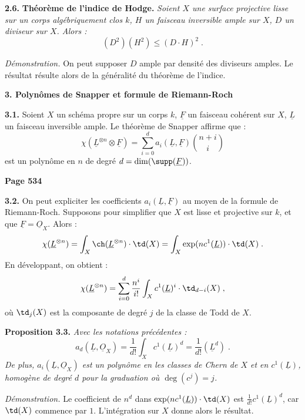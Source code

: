 \smallskip
\noindent\textbf{2.6.} \textbf{Th\'eor\`eme de l'indice de Hodge.} \textit{Soient $X$ une surface projective lisse sur un corps alg\'ebriquement clos $k$, $H$ un faisceau inversible ample sur $X$, $D$ un diviseur sur $X$. Alors :
\[
(D^2)(H^2) \leq (D \cdot H)^2\;.
\]}

\textit{D\'emonstration.} On peut supposer $D$ ample par densit\'e des diviseurs amples. Le r\'esultat r\'esulte alors de la g\'en\'eralit\'e du th\'eor\`eme de l'indice.

\medskip
\noindent\textbf{3. Polyn\^omes de Snapper et formule de Riemann-Roch}

\smallskip
\noindent\textbf{3.1.} Soient $X$ un sch\'ema propre sur un corps $k$, $\underline{F}$ un faisceau coh\'erent sur $X$, $\underline{L}$ un faisceau inversible ample. Le th\'eor\`eme de Snapper affirme que :
\[
\chi(\underline{L}^{\otimes n} \otimes \underline{F}) = \sum_{i=0}^d a_i(\underline{L}, \underline{F}) \binom{n+i}{i}
\]
est un polyn\^ome en $n$ de degr\'e $d = \dim(\supp(\underline{F}))$.

\newpage
\noindent\textbf{Page 534}

\smallskip
\noindent\textbf{3.2.} On peut expliciter les coefficients $a_i(\underline{L}, \underline{F})$ au moyen de la formule de Riemann-Roch. Supposons pour simplifier que $X$ est lisse et projective sur $k$, et que $\underline{F} = \underline{O}_X$. Alors :
\[
\chi(\underline{L}^{\otimes n}) = \int_X \ch(\underline{L}^{\otimes n}) \cdot \td(X) = \int_X \exp(n c^1(\underline{L})) \cdot \td(X)\;.
\]
En d\'eveloppant, on obtient :
\[
\chi(\underline{L}^{\otimes n}) = \sum_{i=0}^d \frac{n^i}{i!} \int_X c^1(\underline{L})^i \cdot \td_{d-i}(X)\;,
\]
o\`u $\td_j(X)$ est la composante de degr\'e $j$ de la classe de Todd de $X$.

\smallskip
\noindent\textbf{Proposition 3.3.} \textit{Avec les notations pr\'ec\'edentes :
\[
a_d(\underline{L}, \underline{O}_X) = \frac{1}{d!} \int_X c^1(\underline{L})^d = \frac{1}{d!} (\underline{L}^d)\;.
\]
De plus, $a_i(\underline{L}, \underline{O}_X)$ est un polyn\^ome en les classes de Chern de $X$ et en $c^1(\underline{L})$, homog\`ene de degr\'e $d$ pour la graduation o\`u $\deg(c^j) = j$.}

\textit{D\'emonstration.} Le coefficient de $n^d$ dans $\exp(n c^1(\underline{L})) \cdot \td(X)$ est $\frac{1}{d!} c^1(\underline{L})^d$, car $\td(X)$ commence par $1$. L'int\'egration sur $X$ donne alors le r\'esultat.

